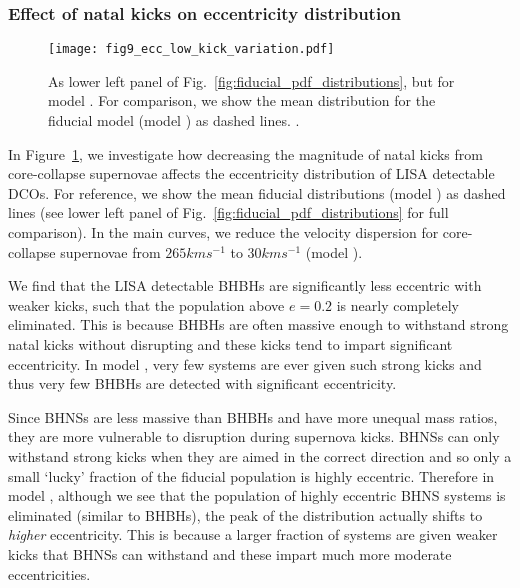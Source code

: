 \subsubsection{Effect of natal kicks on eccentricity distribution}

\begin{figure}[tb]
    \centering
    \texttt{[image: fig9\_ecc\_low\_kick\_variation.pdf]}
    \caption{As lower left panel of Fig.~\ref{fig:fiducial_pdf_distributions}, but for model \modSigLower{}. For comparison, we show the mean distribution for the fiducial model (model \modFid{}) as dashed lines. \href{https://github.com/TomWagg/detecting-DCOs-in-LISA/blob/main/paper/figures/fig9_ecc_low_kick_variation.pdf}{\faFileImage} \href{https://github.com/TomWagg/detecting-DCOs-in-LISA/blob/main/paper/figure_notebooks/variations.ipynb}{\faBook}.}
    \label{fig:ecc_low_kick_variation}
\end{figure}

In Figure~\ref{fig:ecc_low_kick_variation}, we investigate how decreasing the magnitude of natal kicks from core-collapse supernovae affects the eccentricity distribution of LISA detectable DCOs. For reference, we show the mean fiducial distributions (model \modFid{}) as dashed lines (see lower left panel of Fig.~\ref{fig:fiducial_pdf_distributions} for full comparison). In the main curves, we reduce the velocity dispersion for core-collapse supernovae from $265 \unit{km}{s^{-1}}$ to $30 \unit{km}{s^{-1}}$ (model \modSigLower{}).

We find that the LISA detectable BHBHs are significantly less eccentric with weaker kicks, such that the population above $e = 0.2$ is nearly completely eliminated. This is because BHBHs are often massive enough to withstand strong natal kicks without disrupting and these kicks tend to impart significant eccentricity. In model \modSigLower{}, very few systems are ever given such strong kicks and thus very few BHBHs are detected with significant eccentricity.

Since BHNSs are less massive than BHBHs and have more unequal mass ratios, they are more vulnerable to disruption during supernova kicks. BHNSs can only withstand strong kicks when they are aimed in the correct direction and so only a small `lucky' fraction of the fiducial population is highly eccentric. Therefore in model \modSigLower{}, although we see that the population of highly eccentric BHNS systems is eliminated (similar to BHBHs), the peak of the distribution actually shifts to \textit{higher} eccentricity. This is because a larger fraction of systems are given weaker kicks that BHNSs can withstand and these impart much more moderate eccentricities.

